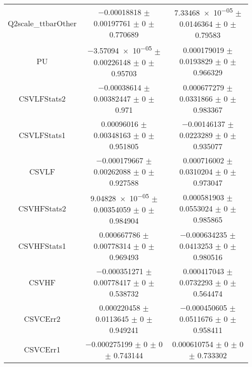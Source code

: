 \begin{table}
\begin{tabular}{ccc}
Q2scale\_ttbarOther & \num{-0.00018818} $\pm$ \num{0.00197761} $\pm$ \num{0} $\pm$ \num{0.770689} & \num{7.33468e-05} $\pm$ \num{0.0146364} $\pm$ \num{0} $\pm$ \num{0.79583}\\
PU & \num{-3.57094e-05} $\pm$ \num{0.00226148} $\pm$ \num{0} $\pm$ \num{0.95703} & \num{0.000179019} $\pm$ \num{0.0193829} $\pm$ \num{0} $\pm$ \num{0.966329}\\
CSVLFStats2 & \num{-0.00038614} $\pm$ \num{0.00382447} $\pm$ \num{0} $\pm$ \num{0.971} & \num{0.000677279} $\pm$ \num{0.0331866} $\pm$ \num{0} $\pm$ \num{0.983367}\\
CSVLFStats1 & \num{0.00096016} $\pm$ \num{0.00348163} $\pm$ \num{0} $\pm$ \num{0.951805} & \num{-0.00146137} $\pm$ \num{0.0223289} $\pm$ \num{0} $\pm$ \num{0.935077}\\
CSVLF & \num{-0.000179667} $\pm$ \num{0.00262088} $\pm$ \num{0} $\pm$ \num{0.927588} & \num{0.000716002} $\pm$ \num{0.0310204} $\pm$ \num{0} $\pm$ \num{0.973047}\\
CSVHFStats2 & \num{9.04828e-05} $\pm$ \num{0.00354059} $\pm$ \num{0} $\pm$ \num{0.984904} & \num{0.000581903} $\pm$ \num{0.0553024} $\pm$ \num{0} $\pm$ \num{0.985865}\\
CSVHFStats1 & \num{0.000667786} $\pm$ \num{0.00778314} $\pm$ \num{0} $\pm$ \num{0.969493} & \num{-0.000634235} $\pm$ \num{0.0413253} $\pm$ \num{0} $\pm$ \num{0.980516}\\
CSVHF & \num{-0.000351271} $\pm$ \num{0.00778417} $\pm$ \num{0} $\pm$ \num{0.538732} & \num{0.000417043} $\pm$ \num{0.0732293} $\pm$ \num{0} $\pm$ \num{0.564474}\\
CSVCErr2 & \num{0.000220458} $\pm$ \num{0.0113645} $\pm$ \num{0} $\pm$ \num{0.949241} & \num{-0.000450605} $\pm$ \num{0.0511676} $\pm$ \num{0} $\pm$ \num{0.958411}\\
CSVCErr1 & \num{-0.000275199} $\pm$ \num{0} $\pm$ \num{0} $\pm$ \num{0.743144} & \num{0.000610754} $\pm$ \num{0} $\pm$ \num{0} $\pm$ \num{0.733302}\\
\bottomrule
\end{tabular}
\end{table}